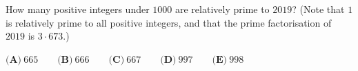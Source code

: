 How many positive integers under $1000$ are relatively prime to $2019$? (Note that $1$ is relatively prime to all positive integers, and that the prime factorisation of $2019$ is $3\cdot673$.)

$\textbf{(A)}\ 665 \qquad \textbf{(B)}\ 666 \qquad \textbf{(C)}\ 667 \qquad \textbf{(D)}\ 997 \qquad \textbf{(E)}\ 998$
